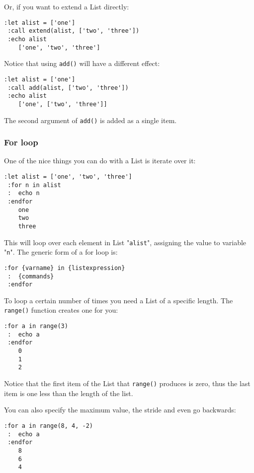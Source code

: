 Or, if you want to extend a List directly:

\begin{Verbatim}[samepage=true]
 :let alist = ['one']
 :call extend(alist, ['two', 'three'])
 :echo alist
    ['one', 'two', 'three']
\end{Verbatim}

Notice that using \verb!add()! will have a different effect:

\begin{Verbatim}[samepage=true]
 :let alist = ['one']
 :call add(alist, ['two', 'three'])
 :echo alist
    ['one', ['two', 'three']]
\end{Verbatim}

The second argument of \verb!add()! is added as a single item.
\subsubsection{For loop}
One of the nice things you can do with a List is iterate over it:

\begin{Verbatim}[samepage=true]
 :let alist = ['one', 'two', 'three']
 :for n in alist
 :  echo n
 :endfor
    one
    two
    three
\end{Verbatim}

This will loop over each element in List "\verb!alist!", assigning the value to variable "\verb!n!".
The generic form of a for loop is:

\begin{Verbatim}[samepage=true]
 :for {varname} in {listexpression}
 :  {commands}
 :endfor
\end{Verbatim}

To loop a certain number of times you need a List of a specific length.
The \verb!range()! function creates one for you:

\begin{Verbatim}[samepage=true]
 :for a in range(3)
 :  echo a
 :endfor
    0
    1
    2
\end{Verbatim}

Notice that the first item of the List that \verb!range()! produces is zero, thus the last item is one less than the length of the list.

You can also specify the maximum value, the stride and even go backwards:

\begin{Verbatim}[samepage=true]
 :for a in range(8, 4, -2)
 :  echo a
 :endfor
    8
    6
    4
\end{Verbatim}

